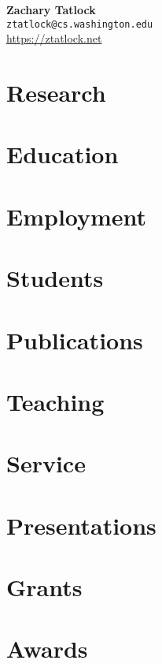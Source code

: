 \documentclass[11pt]{article}
\begin{document}
\noindent
{\LARGE \textbf{Zachary Tatlock}} \\
\texttt{ztatlock@cs.washington.edu} \\
\url{https://ztatlock.net}

\section*{Research}

\section*{Education}

\section*{Employment}

\section*{Students}

\section*{Publications}

\section*{Teaching}

\section*{Service}

\section*{Presentations}

\section*{Grants}

\section*{Awards}
\end{document}
